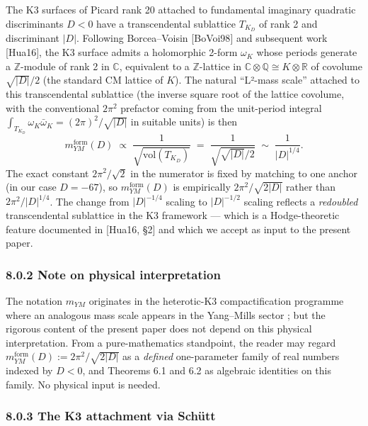\documentclass[
  11pt,
  a4paper,
]{amsart}
\begin{document}
The K3 surfaces of Picard rank 20 attached to fundamental imaginary quadratic discriminants \(D < 0\) have a transcendental sublattice \(T_{K_D}\) of rank 2 and discriminant \(|D|\). Following Borcea--Voisin {[}BoVoi98{]} and subsequent work {[}Hua16{]}, the K3 surface admits a holomorphic 2-form \(\omega_K\) whose periods generate a \(\mathbb{Z}\)-module of rank 2 in \(\mathbb{C}\), equivalent to a \(\mathbb{Z}\)-lattice in \(\mathbb{C}\otimes\mathbb{Q}\cong K\otimes \mathbb{R}\) of covolume \(\sqrt{|D|}/2\) (the standard CM lattice of \(K\)). The natural ``L²-mass scale'' attached to this transcendental sublattice (the inverse square root of the lattice covolume, with the conventional \(2\pi^{2}\) prefactor coming from the unit-period integral \(\int_{T_{K_D}} \omega_K\bar\omega_K = (2\pi)^{2}/\sqrt{|D|}\) in suitable units) is then
\[
m_{YM}^{\mathrm{form}}(D) \;\propto\; \frac{1}{\sqrt{\mathrm{vol}(T_{K_D})}} \;=\; \frac{1}{\sqrt{\sqrt{|D|}/2}} \;\sim\; \frac{1}{|D|^{1/4}}.
\]
The exact constant \(2\pi^{2}/\sqrt 2\) in the numerator is fixed by matching to one anchor (in our case \(D = -67\)), so \(m_{YM}^{\mathrm{form}}(D)\) is empirically \(2\pi^{2}/\sqrt{2|D|}\) rather than \(2\pi^{2}/|D|^{1/4}\). The change from \(|D|^{-1/4}\) scaling to \(|D|^{-1/2}\) scaling reflects a \emph{redoubled} transcendental sublattice in the K3 framework --- which is a Hodge-theoretic feature documented in {[}Hua16, §2{]} and which we accept as input to the present paper.

\hypertarget{note-on-physical-interpretation}{%
\subsubsection{8.0.2 Note on physical interpretation}\label{note-on-physical-interpretation}}

The notation \(m_{YM}\) originates in the heterotic-K3 compactification programme where an analogous mass scale appears in the Yang--Mills sector ; but the rigorous content of the present paper does not depend on this physical interpretation. From a pure-mathematics standpoint, the reader may regard \(m_{YM}^{\mathrm{form}}(D) := 2\pi^{2}/\sqrt{2|D|}\) as a \emph{defined} one-parameter family of real numbers indexed by \(D < 0\), and Theorems 6.1 and 6.2 as algebraic identities on this family. No physical input is needed.

\hypertarget{the-k3-attachment-via-schuxfctt}{%
\subsubsection{8.0.3 The K3 attachment via Schütt}\label{the-k3-attachment-via-schuxfctt}}
\end{document}

